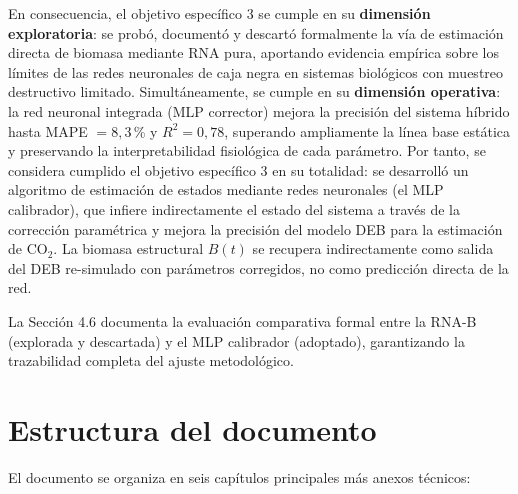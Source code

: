 En consecuencia, el objetivo específico 3 se cumple en su \textbf{dimensión 
exploratoria}: se probó, documentó y descartó formalmente la vía de estimación 
directa de biomasa mediante RNA pura, aportando evidencia empírica sobre los 
límites de las redes neuronales de caja negra en sistemas biológicos con muestreo 
destructivo limitado. Simultáneamente, se cumple en su \textbf{dimensión 
operativa}: la red neuronal integrada (MLP corrector) mejora la precisión del 
sistema híbrido hasta MAPE $= 8,3\,$\% y $R^2 = 0,78$, superando ampliamente la 
línea base estática y preservando la interpretabilidad fisiológica de cada 
parámetro. Por tanto, se considera cumplido el objetivo específico 3 en su 
totalidad: se desarrolló un algoritmo de estimación de estados mediante redes 
neuronales (el MLP calibrador), que infiere indirectamente el estado del sistema 
a través de la corrección paramétrica y mejora la precisión del modelo DEB para 
la estimación de CO$_2$. La biomasa estructural $B(t)$ se recupera indirectamente 
como salida del DEB re-simulado con parámetros corregidos, no como predicción 
directa de la red.

La Sección 4.6 documenta la evaluación comparativa formal entre la RNA-B 
(explorada y descartada) y el MLP calibrador (adoptado), garantizando la 
trazabilidad completa del ajuste metodológico.

\section{Estructura del documento}

El documento se organiza en seis capítulos principales más anexos técnicos:

